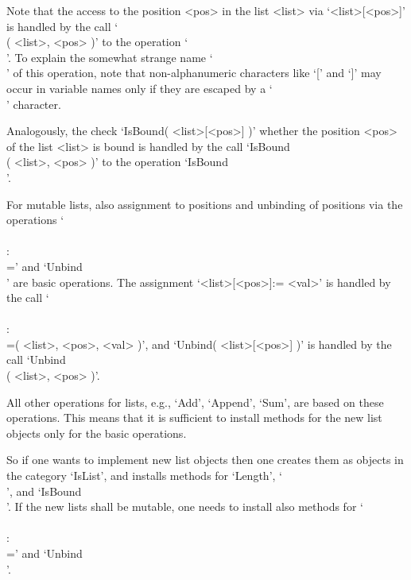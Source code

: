 Note that the access to the position <pos> in the list <list>
via `<list>[<pos>]' is handled by the call `\\[\\]( <list>, <pos> )'
to the operation `\\[\\]'.
To explain the somewhat strange name `\\[\\]' of this operation,
note that non-alphanumeric characters like `[' and `]' may occur in
{\GAP} variable names only if they are escaped by a `\\' character.

Analogously, the check `IsBound( <list>[<pos>] )' whether the position
<pos> of the list <list> is bound is handled by the call
`IsBound\\[\\]( <list>, <pos> )' to the operation
`IsBound\\[\\]'.

For mutable lists, also assignment to positions and unbinding of
positions via the operations `\\[\\]\\:\\=' and `Unbind\\[\\]'
are basic operations.
The assignment `<list>[<pos>]:= <val>' is handled by the call
`\\[\\]\\:\\=( <list>, <pos>, <val> )',
and `Unbind( <list>[<pos>] )' is handled by the call
`Unbind\\[\\]( <list>, <pos> )'.

All other operations for lists, e.g., `Add', `Append', `Sum',
are based on these operations.
This means that it is sufficient to install methods for the new list
objects only for the basic operations.

So if one wants to implement new list objects then one creates them
as objects in the category `IsList', and installs methods for `Length',
`\\[\\]', and `IsBound\\[\\]'.
If the new lists shall be mutable, one needs to install also methods
for `\\[\\]\\:\\=' and `Unbind\\[\\]'.

